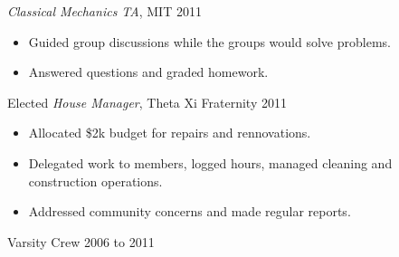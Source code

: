 \documentclass[line,margin]{res}
\begin{document}
\begin{resume}
            {\sl Classical Mechanics TA}, MIT \hfill 2011 \\
    	        \vspace{-4mm} \begin{itemize} \setlength{\itemsep}{-2pt}
		\item Guided group discussions while the groups would solve problems.
		\item Answered questions and graded homework.
		\end{itemize}

	    Elected {\it House Manager}, Theta Xi Fraternity \hfill 2011 \\
		\vspace{-4mm} \begin{itemize} \setlength{\itemsep}{-2pt}
		\item Allocated \$2k budget for repairs and rennovations.
		\item Delegated work to members, logged hours, managed cleaning and construction operations.
		\item Addressed community concerns and made regular reports.
		\end{itemize}

	    Varsity Crew \hfill 2006 to 2011 \\

\end{resume}
\end{document}
